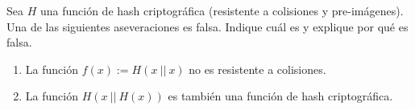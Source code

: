 Sea $H$ una función de hash criptográfica (resistente a colisiones y pre-imágenes). Una de las siguientes aseveraciones es falsa. Indique cuál es y explique por qué es falsa.
\begin{enumerate}
  \item La función $f(x):=H(x\ ||\ x)$ no es resistente a colisiones.
  \item La función $H(x\ ||\ H(x))$ es también una función de hash criptográfica.
\end{enumerate}
